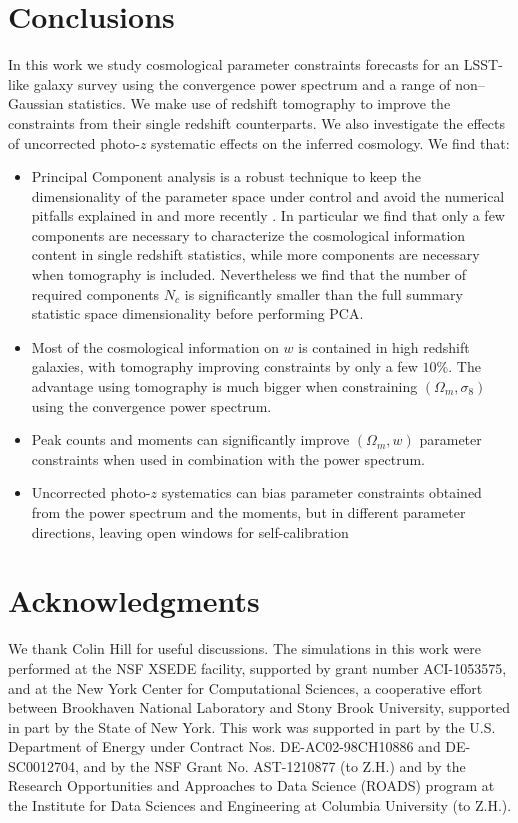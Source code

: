 \documentclass[reprint,aps,prd,superscriptaddress,showkeys,showpacs]{revtex4-1}
\begin{document}
\section{Conclusions}
In this work we study cosmological parameter constraints forecasts for an LSST-like galaxy survey using the convergence power spectrum and a range of non--Gaussian statistics. We make use of redshift tomography to improve the constraints from their single redshift counterparts. We also investigate the effects of uncorrected photo-$z$ systematic effects on the inferred cosmology. We find that:
\begin{itemize}
	\item Principal Component analysis is a robust technique to keep the dimensionality of the parameter space under control and avoid the numerical pitfalls explained in \citep{Taylor12,DodelsonSchneider13,Taylor14} and more recently \citep{PetriVariance}. In particular we find that only a few components are necessary to characterize the cosmological information content in single redshift statistics, while more components are necessary when tomography is included. Nevertheless we find that the number of required components $N_c$ is significantly smaller than the full summary statistic space dimensionality before performing PCA.
	\item Most of the cosmological information on $w$ is contained in high redshift galaxies, with tomography improving constraints by only a few $10\%$. The advantage using tomography is much bigger when constraining $(\Omega_m,\sigma_8)$ using the convergence power spectrum.    
	\item Peak counts and moments can significantly improve $(\Omega_m,w)$ parameter constraints when used in combination with the power spectrum.
	\item Uncorrected photo-$z$ systematics can bias parameter constraints obtained from the power spectrum and the moments, but in different parameter directions, leaving open windows for self-calibration
\end{itemize}


\section*{Acknowledgments}

We thank Colin Hill for useful discussions. The simulations in this work
were performed at the NSF XSEDE facility, supported by grant number
ACI-1053575, and at the New York Center for Computational Sciences, a
cooperative effort between Brookhaven National Laboratory and Stony
Brook University, supported in part by the State of New York. This
work was supported in part by the U.S. Department of Energy under
Contract Nos. DE-AC02-98CH10886 and DE-SC0012704, and by the NSF Grant
No. AST-1210877 (to Z.H.) and by the Research Opportunities and
Approaches to Data Science (ROADS) program at the Institute for Data
Sciences and Engineering at Columbia University (to Z.H.). 




\label{lastpage}
\end{document}
